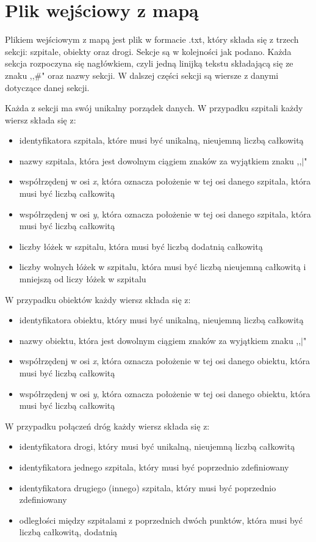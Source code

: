 \documentclass[10pt,a4paper]{article}
\begin{document}
\section{Plik wejściowy z mapą}

Plikiem wejściowym z mapą jest plik w formacie .txt, który składa się z trzech sekcji: szpitale, obiekty oraz drogi. Sekcje są w kolejności jak podano. Każda sekcja rozpoczyna się nagłówkiem, czyli jedną linijką tekstu składającą się ze znaku ,,\#" oraz nazwy sekcji. W dalszej części sekcji są wiersze z danymi dotyczące danej sekcji.

Każda z sekcji ma swój unikalny porządek danych. W przypadku szpitali każdy wiersz składa się z:
\begin{itemize}
\item identyfikatora szpitala, które musi być unikalną, nieujemną liczbą całkowitą
\item nazwy szpitala, która jest dowolnym ciągiem znaków za wyjątkiem znaku ,,$\mid$"
\item współrzędenj w osi \textit{x}, która oznacza położenie w tej osi danego szpitala, która musi być liczbą całkowitą
\item współrzędenj w osi \textit{y}, która oznacza położenie w tej osi danego szpitala, która musi być liczbą całkowitą
\item liczby łóżek w szpitalu, która musi być liczbą dodatnią całkowitą
\item liczby wolnych łóżek w szpitalu, która musi być liczbą nieujemną całkowitą i mniejszą od liczy łóżek w szpitalu
\end{itemize}
W przypadku obiektów każdy wiersz składa się z:
\begin{itemize}
\item identyfikatora obiektu, który musi być unikalną, nieujemną liczbą całkowitą
\item nazwy obiektu, która jest dowolnym ciągiem znaków za wyjątkiem znaku ,,$\mid$"
\item współrzędenj w osi \textit{x}, która oznacza położenie w tej osi danego obiektu, która musi być liczbą całkowitą
\item współrzędenj w osi \textit{y}, która oznacza położenie w tej osi danego obiektu, która musi być liczbą całkowitą
\end{itemize}
W przypadku połączeń dróg każdy wiersz składa się z:
\begin{itemize}
\item identyfikatora drogi, który musi być unikalną, nieujemną liczbą całkowitą
\item identyfikatora jednego szpitala, który musi być poprzednio zdefiniowany
\item identyfikatora drugiego (innego) szpitala, który musi być poprzednio zdefiniowany
\item odległości między szpitalami z poprzednich dwóch punktów, która musi być liczbą całkowitą, dodatnią
\end{itemize}
\end{document}
